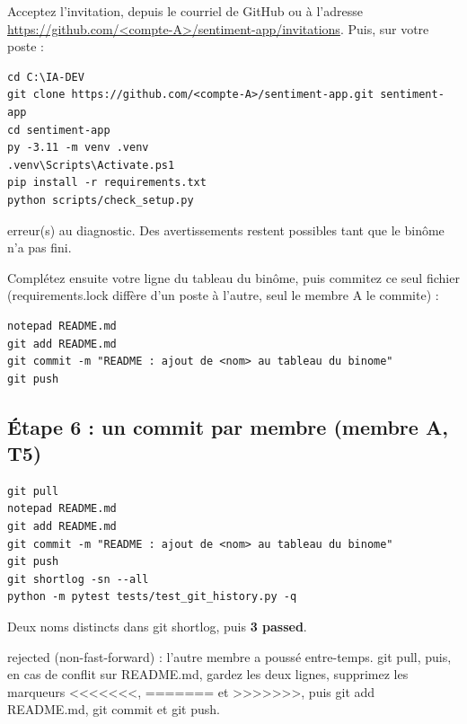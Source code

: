 \documentclass[11pt,a4paper]{article}
\newcommand{\co}[1]{{\ttfamily\hyphenchar\font=45\relax #1}}
\begin{document}
Acceptez l'invitation, depuis le courriel de GitHub ou à l'adresse
\url{https://github.com/<compte-A>/sentiment-app/invitations}. Puis, sur votre poste :

\begin{lstlisting}
cd C:\IA-DEV
git clone https://github.com/<compte-A>/sentiment-app.git sentiment-app
cd sentiment-app
py -3.11 -m venv .venv
.venv\Scripts\Activate.ps1
pip install -r requirements.txt
python scripts/check_setup.py
\end{lstlisting}

\begin{attendu}
\co{0 erreur(s)} au diagnostic. Des avertissements restent possibles tant que le binôme n'a pas fini.
\end{attendu}

Complétez ensuite votre ligne du tableau du binôme, puis commitez ce seul fichier
(\co{requirements.lock} diffère d'un poste à l'autre, seul le membre A le commite) :

\begin{lstlisting}
notepad README.md
git add README.md
git commit -m "README : ajout de <nom> au tableau du binome"
git push
\end{lstlisting}

\subsection{Étape 6 : un commit par membre (membre A, T5)}

\begin{lstlisting}
git pull
notepad README.md
git add README.md
git commit -m "README : ajout de <nom> au tableau du binome"
git push
git shortlog -sn --all
python -m pytest tests/test_git_history.py -q
\end{lstlisting}

\begin{attendu}
Deux noms distincts dans \co{git shortlog}, puis \textbf{3 passed}.
\end{attendu}

\begin{attention}
\co{rejected (non-fast-forward)} : l'autre membre a poussé entre-temps. \co{git pull}, puis, en cas de
conflit sur \co{README.md}, gardez les deux lignes, supprimez les marqueurs \co{<{}<{}<{}<{}<{}<{}<}, \co{=======} et
\co{>{}>{}>{}>{}>{}>{}>}, puis \co{git add README.md}, \co{git commit} et \co{git push}.
\end{attention}
\end{document}
